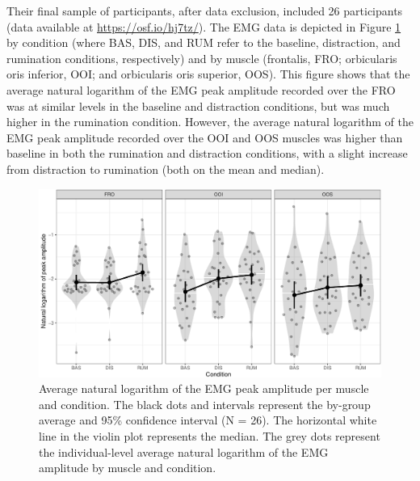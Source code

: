 \documentclass[
  english,
  man, donotrepeattitle,floatsintext]{apa6}
\begin{document}
Their final sample of participants, after data exclusion, included 26 participants (data available at \url{https://osf.io/hj7tz/}). The EMG data is depicted in Figure \ref{fig:general} by condition (where BAS, DIS, and RUM refer to the baseline, distraction, and rumination conditions, respectively) and by muscle (frontalis, FRO; orbicularis oris inferior, OOI; and orbicularis oris superior, OOS). This figure shows that the average natural logarithm of the EMG peak amplitude recorded over the FRO was at similar levels in the baseline and distraction conditions, but was much higher in the rumination condition. However, the average natural logarithm of the EMG peak amplitude recorded over the OOI and OOS muscles was higher than baseline in both the rumination and distraction conditions, with a slight increase from distraction to rumination (both on the mean and median).

\begin{figure}[!htb]

{\centering \includegraphics[width=1\linewidth]{manuscript_files/figure-latex/general-1} 

}

\caption{Average natural logarithm of the EMG peak amplitude per muscle and condition. The black dots and intervals represent the by-group average and 95\% confidence interval (N = 26). The horizontal white line in the violin plot represents the median. The grey dots represent the individual-level average natural logarithm of the EMG amplitude by muscle and condition.}\label{fig:general}
\end{figure}
\end{document}

